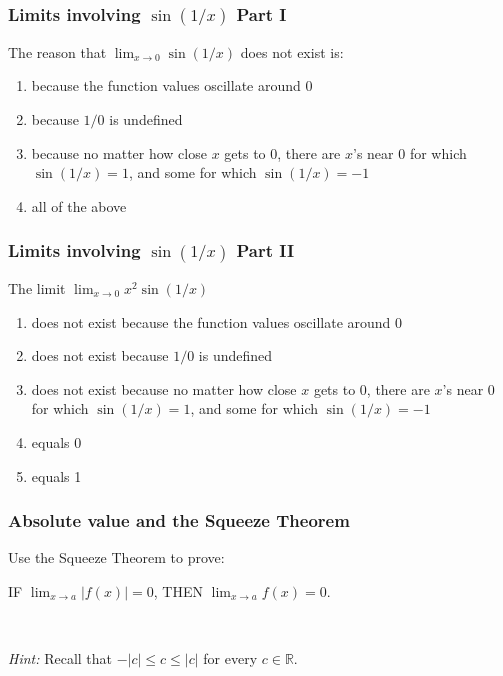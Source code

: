 \documentclass[14pt]{beamer}
\newcommand {\DS} [1] {${\displaystyle #1}$}
\newcommand {\R}{\mathbb{R}}
\begin{document}

\begin{frame}
\frametitle{Limits involving \DS{\sin(1/x)} Part I}

\begin{block}{
The reason that \DS{{\lim_{x\rightarrow 0}\sin (1/x)}} does not exist is:}

\begin{enumerate}
\item because the function values oscillate around $0$
\item because $1/0$ is undefined
\item because no matter how close $x$ gets to $0$, there are $x$'s near $0$ for which $\sin(1/x) =1$, and some for which $\sin (1/x)=-1$
\item all of the above
\end{enumerate}

\end{block}

\end{frame}



\begin{frame}
\frametitle{Limits involving \DS{\sin(1/x)} Part II}

\begin{block}{The limit 
$\displaystyle{\lim_{x\rightarrow 0}x^2\sin (1/x)}$ }
\begin{enumerate}
\item does not exist because the function values oscillate around $0$
\item does not exist because $1/0$ is undefined
\item does not exist because no matter how close $x$ gets to $0$, there are $x$'s near $0$ for which $\sin(1/x) =1$, and some for which $\sin (1/x)=-1$
\item equals 0 
\item equals 1
\end{enumerate}
\end{block}
\end{frame}



\begin{frame}
\frametitle{Absolute value and the Squeeze Theorem}

Use the Squeeze Theorem to prove:
\begin{theorem}
IF \DS{\lim_{x\to a}|f(x)| = 0}, THEN \DS{\lim_{x\to a}f(x)=0}.\\
\end{theorem}

\

\emph{Hint:} Recall that $-|c| \leq c \leq |c|$ for every $c \in \R$.

\end{frame}
\end{document}
